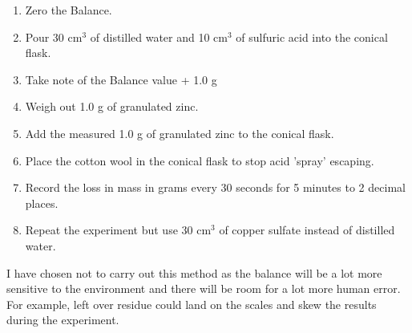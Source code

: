 \begin{enumerate}
\item Zero the Balance.
\item Pour 30 cm$^3$ of distilled water and 10 cm$^3$ of sulfuric acid into the conical flask.
\item Take note of the Balance value + 1.0 g
\item Weigh out 1.0 g of granulated zinc.
\item Add the measured 1.0 g of granulated zinc to the conical flask.
\item Place the cotton wool in the conical flask to stop acid 'spray' escaping.
\item Record the loss in mass in grams every 30 seconds for 5 minutes to 2 decimal places.
\item Repeat the experiment but use 30 cm$^3$ of copper sulfate instead of distilled water.
\end{enumerate} 

I have chosen not to carry out this method as the balance will be a lot more sensitive to the environment and there will be room for a lot more human error. For example, left over residue could land on the scales and skew the results during the experiment. 


